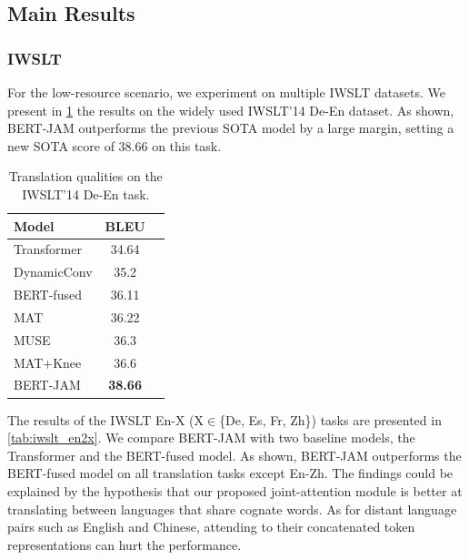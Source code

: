 \documentclass[review]{elsarticle}
\begin{document}
\subsection{Main Results}

\subsubsection{IWSLT}
For the low-resource scenario, we experiment on multiple IWSLT datasets. 
We present in \cref{tab:iwslt_de2en} the results on the widely used IWSLT'14 De-En dataset. As shown, BERT-JAM outperforms the previous SOTA model by a large margin, setting a new SOTA score of 38.66 on this task.

\begin{table}[ht]
    \caption{Translation qualities on the IWSLT'14 De-En task.}
    \label{tab:iwslt_de2en}
    \centering
    \begin{tabular}{lcc}
        \toprule
        \textbf{Model}            & \textbf{BLEU}    \\
        \midrule
        Transformer \cite{Vaswani17}  &   34.64  \\
        DynamicConv \cite{Wu19}         &     35.2  \\
        BERT-fused \cite{Zhu20} & 36.11 \\
        MAT \cite{Fan20} & 36.22 \\
        MUSE \cite{Zhao19} & 36.3 \\
        MAT+Knee \cite{Iyer20} & 36.6   \\
        BERT-JAM   &   \textbf{38.66}  \\
        \bottomrule
    \end{tabular}
\end{table}


The results of the IWSLT En-X (X$\in$\{De, Es, Fr, Zh\}) tasks are presented in \cref{tab:iwslt_en2x}. We compare BERT-JAM with two baseline models, the Transformer and the BERT-fused model.
As shown, BERT-JAM outperforms the BERT-fused model on all translation tasks except En-Zh. The findings could be explained by the hypothesis that our proposed joint-attention module is better at translating between languages that share cognate words. As for distant language pairs such as English and Chinese, attending to their concatenated token representations can hurt the performance.
\end{document}
